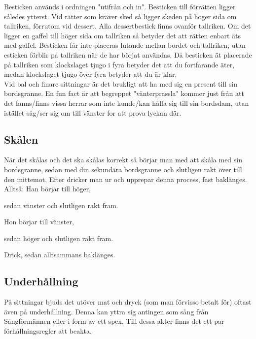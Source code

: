 \newpage

Besticken används i ordningen "utifrån och in".
Besticken till förrätten ligger således ytterst.
Vid rätter som kräver sked så ligger skeden på höger sida om tallriken, förrutom vid dessert.
Alla dessertbestick finns ovanför tallriken.
Om det ligger en gaffel till höger sida om tallriken så betyder det att rätten enbart äts med gaffel.
Besticken får inte placeras lutande mellan bordet och tallriken, utan esticken förblir på tallriken när de har börjat användas. 
Då besticken ät placerade på tallriken som klockslaget tjugo i fyra betyder det att du fortfarande äter,
medan klockslaget tjugo över fyra betyder att du är klar.
\\

Vid bal och finare sittningar är det brukligt att ha med sig en present till sin bordsgranne. 
En fun fact är att begreppet "vänterprassla" kommer just från att det fanns/finns vissa herrar som inte kunde/kan hålla sig till sin bordsdam, 
utan istället såg/ser sig om till vänster for att prova lyckan där.



\newpage

\subsection*{Skålen}

När det skålas och det ska skålas korrekt så börjar man 
med att skåla med sin bordsgranne, sedan med din sekundära 
bordsgranne och slutligen rakt över till den mittemot. 
Efter dricker man ur och upprepar denna process, fast baklänges.
\\

Alltså:
Han börjar till höger,

sedan vänster och slutligen rakt fram.

Hon börjar till vänster,

sedan höger och slutligen rakt fram.

Drick, sedan alltsammans baklänges.


\newpage

\subsection*{Underhållning}
På sittningar bjuds det utöver mat och dryck (som man förvisso betalt för) oftast även på underhållning.
Denna kan yttra sig antingen som sång från Sångförmännen eller i form av ett spex.
Till dessa akter finns det ett par förhållningsregler att beakta.
\\

